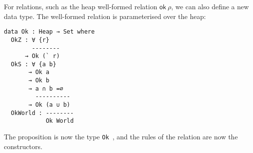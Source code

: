 For relations, such as the heap well-formed relation
$\textsf{ok} \ \rho$, we can also define a new data type. The well-formed
relation is parameterised over the heap:
\begin{verbatim}
data Ok : Heap → Set where
  OkZ : ∀ {r}
        --------
      → Ok (` r)
  OkS : ∀ {a b}
       → Ok a
       → Ok b
       → a ∩ b =∅
         ----------
       → Ok (a ∪ b)
  OkWorld : --------
            Ok World
\end{verbatim}
The proposition is now the type \texttt{Ok \rho}, and the rules
of the relation are now the constructors.